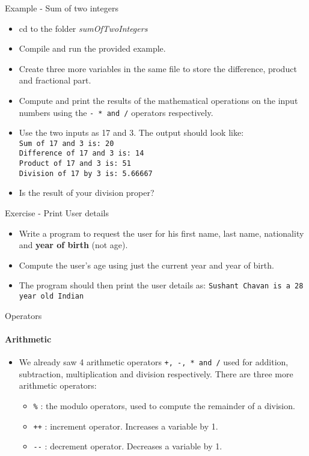 \documentclass[aspectratio=169]{beamer}
\begin{document}
\begin{frame}[fragile]{Example - Sum of two integers}
    \begin{itemize}
        \item cd to the folder \textit{sumOfTwoIntegers}
        \item Compile and run the provided example.
        \item Create three more variables in the same file to store the difference, product and fractional part.
        \item Compute and print the results of the mathematical operations on the input numbers using the \verb|- * and /| operators respectively.
        \item Use the two inputs as 17 and 3. The output should look like: \\ \verb|Sum of 17 and 3 is: 20| \\ \verb|Difference of 17 and 3 is: 14| \\ \verb|Product of 17 and 3 is: 51| \\ \verb|Division of 17 by 3 is: 5.66667|
        \item Is the result of your division proper?
    \end{itemize}
\end{frame}

\begin{frame}[fragile]{Exercise - Print User details}
    \begin{itemize}
        \item Write a program to request the user for his first name, last name, nationality and \textbf{year of birth} (not age).
        \item Compute the user's age using just the current year and year of birth.
        \item The program should then print the user details as: \verb|Sushant Chavan is a 28 year old Indian|
    \end{itemize}
\end{frame}

\begin{frame}[fragile]{Operators}
    \framesubtitle{Arithmetic}
    \begin{itemize}
        \item We already saw 4 arithmetic operators \verb|+, -, * and /| used for addition, subtraction, multiplication and division respectively. There are three more arithmetic operators:
        \begin{itemize}
            \item \verb|%| : the modulo operators, used to compute the remainder of a division.
            \item \verb|++| : increment operator. Increases a variable by 1.
            \item \verb|--| : decrement operator. Decreases a variable by 1.
        \end{itemize}

    \end{itemize}
\end{frame}
\end{document}
